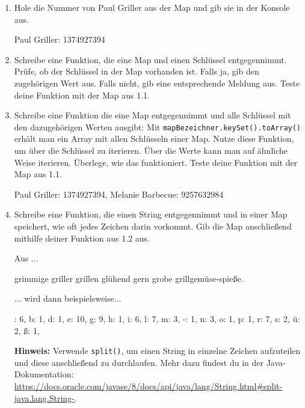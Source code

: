 \documentclass{../../sheet}
\begin{document}
\begin{enumerate}
    \item Hole die Nummer von Paul Griller aus der Map und gib sie in der Konsole aus.

          \begin{ausgabe}
              Paul Griller: 1374927394
          \end{ausgabe}
        
     \item Schreibe eine Funktion, die eine Map und einen Schlüssel entgegennimmt. Prüfe, ob der Schlüssel in der Map vorhanden ist. Falls ja, gib den zugehörigen Wert aus. Falls nicht, gib eine entsprechende Meldung aus. Teste deine Funktion mit der Map aus 1.1.

    \item Schreibe eine Funktion die eine Map entgegennimmt und alle Schlüssel mit den dazugehörigen Werten ausgibt:
    \newline Mit \texttt{mapBezeichner.keySet().toArray()} erhält man ein Array mit allen Schlüsseln einer Map. Nutze diese Funktion, um über die Schlüssel zu iterieren. Über die Werte kann man auf ähnliche Weise iterieren. Überlege, wie das funktioniert. Teste deine Funktion mit der Map aus 1.1.
          \begin{ausgabe}
              Paul Griller: 1374927394, Melanie Barbecue: 9257632984
          \end{ausgabe}
    
    \item Schreibe eine Funktion, die einen String entgegennimmt und in einer Map speichert, wie oft jedes Zeichen darin vorkommt.
          Gib die Map anschließend mithilfe deiner Funktion aus 1.2 aus.
          
          Aus ...
          \begin{ausgabe}
              grimmige griller grillen glühend gern grobe grillgemüse-spieße.
          \end{ausgabe}
          ... wird dann beispielsweise...
           \begin{ausgabe}
             : 6, b: 1, d: 1, e: 10, g: 9, h: 1, i: 6, l: 7, m: 3, -: 1, n: 3, o: 1, p: 1, r: 7, s: 2, ü: 2, ß: 1, 

          \end{ausgabe}

            \textbf{Hinweis:} Verwende \texttt{split()}, um einen String in einzelne Zeichen aufzuteilen und diese anschließend zu durchlaufen. Mehr dazu findest du in der Java-Dokumentation: \url{https://docs.oracle.com/javase/8/docs/api/java/lang/String.html#split-java.lang.String-}.         


\end{enumerate}
\end{document}
